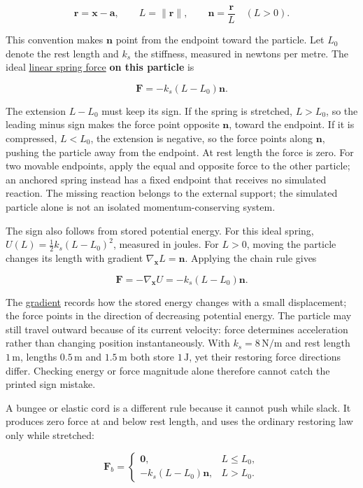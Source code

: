\[
\mathbf{r}=\mathbf{x}-\mathbf{a},\qquad
L=\|\mathbf r\|,\qquad
\mathbf n=\frac{\mathbf r}{L}\quad(L>0).
\]

This convention makes \(\mathbf n\) point from the endpoint toward the particle. Let \(L_0\) denote the rest length and \(k_s\) the stiffness, measured in newtons per metre. The ideal \hyperref[appendix-e040e2108923]{linear spring force} \textbf{on this particle} is

\[
\mathbf F=-k_s(L-L_0)\mathbf n.
\]

The extension \(L-L_0\) must keep its sign. If the spring is stretched, \(L>L_0\), so the leading minus sign makes the force point opposite \(\mathbf n\), toward the endpoint. If it is compressed, \(L<L_0\), the extension is negative, so the force points along \(\mathbf n\), pushing the particle away from the endpoint. At rest length the force is zero. For two movable endpoints, apply the equal and opposite force to the other particle; an anchored spring instead has a fixed endpoint that receives no simulated reaction. The missing reaction belongs to the external support; the simulated particle alone is not an isolated momentum-conserving system.

The sign also follows from stored potential energy. For this ideal spring, \(U(L)=\tfrac12k_s(L-L_0)^2\), measured in joules. For \(L>0\), moving the particle changes its length with gradient \(\nabla_{\mathbf x}L=\mathbf n\). Applying the chain rule gives

\[
\mathbf F=-\nabla_{\mathbf x}U=-k_s(L-L_0)\mathbf n.
\]

The \hyperref[appendix-677b59746ae0]{gradient} records how the stored energy changes with a small displacement; the force points in the direction of decreasing potential energy. The particle may still travel outward because of its current velocity: force determines acceleration rather than changing position instantaneously. With \(k_s=8\,\mathrm{N/m}\) and rest length \(1\,\mathrm m\), lengths \(0.5\,\mathrm m\) and \(1.5\,\mathrm m\) both store \(1\,\mathrm J\), yet their restoring force directions differ. Checking energy or force magnitude alone therefore cannot catch the printed sign mistake.

A bungee or elastic cord is a different rule because it cannot push while slack. It produces zero force at and below rest length, and uses the ordinary restoring law only while stretched:

\[
\mathbf F_b=
\begin{cases}
\mathbf 0,&L\le L_0,\\
-k_s(L-L_0)\mathbf n,&L>L_0.
\end{cases}
\]

